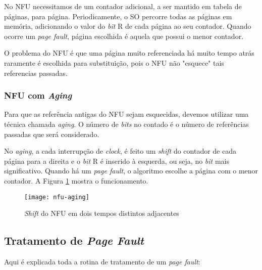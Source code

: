 No NFU necessitamos de um contador adicional, a ser mantido em tabela de páginas, para página. Periodicamente, o SO percorre todas as páginas em memória, adicionando o valor do \textit{bit} R de cada página ao seu contador. Quando ocorre um \textit{page fault}, página escolhida é aquela que possui o menor contador.

O problema do NFU é que uma página muito referenciada há muito tempo atrás raramente é escolhida para substituição, pois o NFU não "esquece" tais referencias passadas.


\subsubsection{NFU com \textit{Aging}}
Para que as referência antigas do NFU sejam esquecidas, devemos utilizar uma técnica chamada \textit{aging}. O número de \textit{bits} no contado é o número de referências passadas que será considerado.

No \textit{aging}, a cada interrupção de \textit{clock}, é feito um \textit{shift} do contador de cada página para a direita e o \textit{bit} R é inserido à esquerda, ou seja, no \textit{bit} mais significativo. Quando há um \textit{page fault}, o algoritmo escolhe a página com o menor contador. A Figura \ref{fig:nfu-aging} mostra o funcionamento.

\begin{figure}[h]
  \centering
  \texttt{[image: nfu-aging]}
  \caption{\textit{Shift} do NFU em dois tempos distintos adjacentes}
  \label{fig:nfu-aging}
\end{figure}




\subsection{Tratamento de \textit{Page Fault}}
Aqui é explicada toda a rotina de tratamento de um \textit{page fault}:

